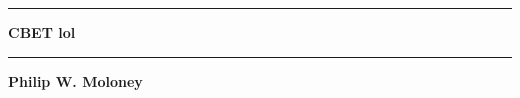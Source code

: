 \begin{titlepage}
		

			\begin{center}
				\vfill
				\Huge
				\rule{\linewidth}{2pt}
				\textbf{CBET lol}
				\rule{\linewidth}{2pt}		
				\vfill
				\vspace{1cm}
				\Large
				\textbf{Philip W. Moloney}

			\end{center}

\end{titlepage}